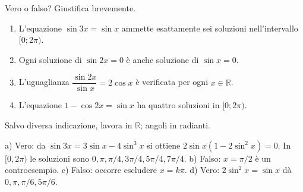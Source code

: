 
\begin{esercizio}
Vero o falso? Giustifica brevemente. 

\begin{enumerate}
\item L'equazione $\sin 3x=\sin x$ ammette esattamente sei
soluzioni nell'intervallo $[0;2\pi)$. 

\item Ogni soluzione di $\sin 2x=0$ è anche soluzione di
$\sin x=0$. 

\item L'uguaglianza $\dfrac{\sin 2x}{\sin x}=2\cos x$
è verificata per ogni $x\in\mathbb{R}$. 

\item L'equazione $1-\cos 2x=\sin x$ ha quattro soluzioni
in $[0;2\pi)$. 
\end{enumerate}
Salvo diversa indicazione, lavora in $\mathbb R$; angoli in radianti.
\end{esercizio}

\begin{soluzione}
a) Vero: da $\sin3x=3\sin x-4\sin^3x$ si ottiene $2\sin x(1-2\sin^2x)=0$.
In $[0,2\pi)$ le soluzioni sono $0,\pi,\pi/4,3\pi/4,5\pi/4,7\pi/4$.
b) Falso: $x=\pi/2$ è un controesempio.
c) Falso: occorre escludere $x=k\pi$.
d) Vero: $2\sin^2x=\sin x$ dà $0,\pi,\pi/6,5\pi/6$.
\end{soluzione}

